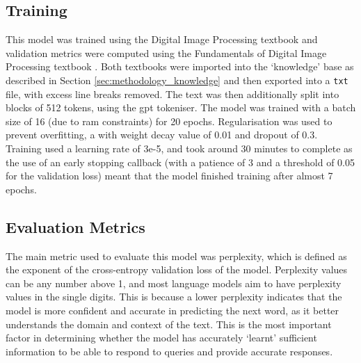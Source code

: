 \subsection{Training}
This model was trained using the Digital Image Processing textbook \citep{gonzalez2018digital} and validation metrics were computed using the Fundamentals of Digital Image Processing textbook \citep{solomon2010fundamentals}. Both textbooks were imported into the `knowledge' base as described in Section \ref{sec:methodology_knowledge} and then exported into a \texttt{txt} file, with excess line breaks removed. The text was then additionally split into blocks of 512 tokens, using the \acrshort{gpt} tokeniser. The model was trained with a batch size of 16 (due to \acrshort{ram} constraints) for 20 epochs. Regularisation was used to prevent overfitting, a with weight decay value of 0.01 and dropout of 0.3. Training used a learning rate of 3e-5, and took around 30 minutes to complete as the use of an early stopping callback (with a patience of 3 and a threshold of 0.05 for the validation loss) meant that the model finished training after almost 7 epochs. %

\subsection{Evaluation Metrics}
The main metric used to evaluate this model was perplexity, which is defined as the exponent of the cross-entropy validation loss of the model. Perplexity values can be any number above 1, and most language models aim to have perplexity values in the single digits. This is because a lower perplexity indicates that the model is more confident and accurate in predicting the next word, as it better understands the domain and context of the text. This is the most important factor in determining whether the model has accurately `learnt' sufficient information to be able to respond to queries and provide accurate responses. 



